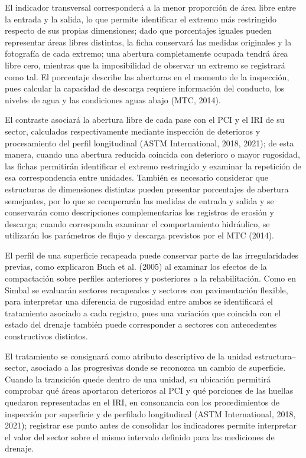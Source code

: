 El indicador transversal corresponderá a la menor proporción de área libre entre la entrada y la salida, lo que permite identificar el extremo más restringido respecto de sus propias dimensiones; dado que porcentajes iguales pueden representar áreas libres distintas, la ficha conservará las medidas originales y la fotografía de cada extremo; una abertura completamente ocupada tendrá área libre cero, mientras que la imposibilidad de observar un extremo se registrará como tal. El porcentaje describe las aberturas en el momento de la inspección, pues calcular la capacidad de descarga requiere información del conducto, los niveles de agua y las condiciones aguas abajo (MTC, 2014).

El contraste asociará la abertura libre de cada pase con el PCI y el IRI de su sector, calculados respectivamente mediante inspección de deterioros y procesamiento del perfil longitudinal (ASTM International, 2018, 2021); de esta manera, cuando una abertura reducida coincida con deterioro o mayor rugosidad, las fichas permitirán identificar el extremo restringido y examinar la repetición de esa correspondencia entre unidades. También es necesario considerar que estructuras de dimensiones distintas pueden presentar porcentajes de abertura semejantes, por lo que se recuperarán las medidas de entrada y salida y se conservarán como descripciones complementarias los registros de erosión y descarga; cuando corresponda examinar el comportamiento hidráulico, se utilizarán los parámetros de flujo y descarga previstos por el MTC (2014).


El perfil de una superficie recapeada puede conservar parte de las irregularidades previas, como explicaron Buch et al. (2005) al examinar los efectos de la compactación sobre perfiles anteriores y posteriores a la rehabilitación. Como en Simbal se evaluarán sectores recapeados y sectores con pavimentación flexible, para interpretar una diferencia de rugosidad entre ambos se identificará el tratamiento asociado a cada registro, pues una variación que coincida con el estado del drenaje también puede corresponder a sectores con antecedentes constructivos distintos.

El tratamiento se consignará como atributo descriptivo de la unidad estructura–sector, asociado a las progresivas donde se reconozca un cambio de superficie. Cuando la transición quede dentro de una unidad, su ubicación permitirá comprobar qué áreas aportaron deterioros al PCI y qué porciones de las huellas quedaron representadas en el IRI, en consonancia con los procedimientos de inspección por superficie y de perfilado longitudinal (ASTM International, 2018, 2021); registrar ese punto antes de consolidar los indicadores permite interpretar el valor del sector sobre el mismo intervalo definido para las mediciones de drenaje.

